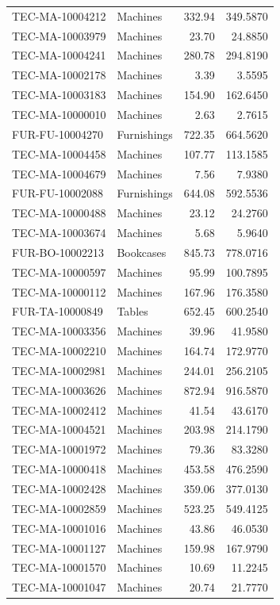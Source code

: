 \begin{longtable}{llrr}
TEC-MA-10004212 & Machines & 332.94 & 349.5870\\
TEC-MA-10003979 & Machines & 23.70 & 24.8850\\
TEC-MA-10004241 & Machines & 280.78 & 294.8190\\
TEC-MA-10002178 & Machines & 3.39 & 3.5595\\
TEC-MA-10003183 & Machines & 154.90 & 162.6450\\
TEC-MA-10000010 & Machines & 2.63 & 2.7615\\
FUR-FU-10004270 & Furnishings & 722.35 & 664.5620\\
TEC-MA-10004458 & Machines & 107.77 & 113.1585\\
TEC-MA-10004679 & Machines & 7.56 & 7.9380\\
FUR-FU-10002088 & Furnishings & 644.08 & 592.5536\\
TEC-MA-10000488 & Machines & 23.12 & 24.2760\\
TEC-MA-10003674 & Machines & 5.68 & 5.9640\\
FUR-BO-10002213 & Bookcases & 845.73 & 778.0716\\
TEC-MA-10000597 & Machines & 95.99 & 100.7895\\
TEC-MA-10000112 & Machines & 167.96 & 176.3580\\
FUR-TA-10000849 & Tables & 652.45 & 600.2540\\
TEC-MA-10003356 & Machines & 39.96 & 41.9580\\
TEC-MA-10002210 & Machines & 164.74 & 172.9770\\
TEC-MA-10002981 & Machines & 244.01 & 256.2105\\
TEC-MA-10003626 & Machines & 872.94 & 916.5870\\
TEC-MA-10002412 & Machines & 41.54 & 43.6170\\
TEC-MA-10004521 & Machines & 203.98 & 214.1790\\
TEC-MA-10001972 & Machines & 79.36 & 83.3280\\
TEC-MA-10000418 & Machines & 453.58 & 476.2590\\
TEC-MA-10002428 & Machines & 359.06 & 377.0130\\
TEC-MA-10002859 & Machines & 523.25 & 549.4125\\
TEC-MA-10001016 & Machines & 43.86 & 46.0530\\
TEC-MA-10001127 & Machines & 159.98 & 167.9790\\
TEC-MA-10001570 & Machines & 10.69 & 11.2245\\
TEC-MA-10001047 & Machines & 20.74 & 21.7770\\

\end{longtable}
